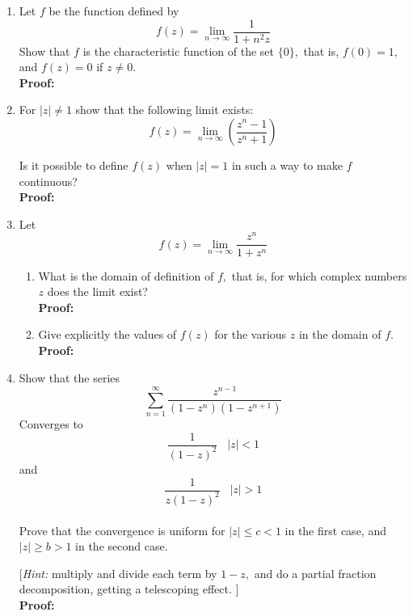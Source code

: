 \begin{enumerate}
	\item Let $f$ be the function defined by
	\[ f(z) = \lim_{n \to \infty} \frac{1}{1 + n^2 z} \]
	Show that $f$ is the characteristic function of the set $\{0\},$ that is, $f(0) = 1,$ and $f(z) = 0$ if $z \neq 0.$ \\
			
	\textbf{Proof:} \\

	\item For $|z| \neq 1$ show that the following limit exists:
	\[ f(z) = \lim_{n \to \infty} \left( \frac{z^n - 1}{z^n + 1} \right) \]

	Is it possible to define $f(z)$ when $|z| = 1$ in such a way to make $f$ continuous? \\
		
	\textbf{Proof:} \\


	\item Let
	\[ f(z) = \lim_{n \to \infty} \frac{z^n}{1 + z^n} \]
	\begin{enumerate}
		\item What is the domain of definition of $f,$ that is, for which complex numbers $z$ does the limit exist? \\
		
		\textbf{Proof:} \\
	
		\item Give explicitly the values of $f(z)$ for the various $z$ in the domain of $f.$ \\
		
		\textbf{Proof:} \\
	
	\end{enumerate}

	\item Show that the series
	\[ \sum_{n = 1}^{\infty} \frac{z^{n - 1}}{(1 - z^n )(1 - z^{n + 1})} \]
	Converges to
	\[ \frac{1}{(1 - z)^2 } \;\;\; |z| < 1 \]
	and
	\[\frac{1}{z(1 - z)^2 } \;\;\; |z| > 1\] \\

	Prove that the convergence is uniform for $|z| \leq c < 1$ in the first case, and $|z| \geq b > 1$ in the second case. 

	[\textit{Hint:} multiply and divide each term by $1 - z,$ and do a partial fraction decomposition, getting a telescoping effect. ] \\
			
	\textbf{Proof:} \\

\end{enumerate}

